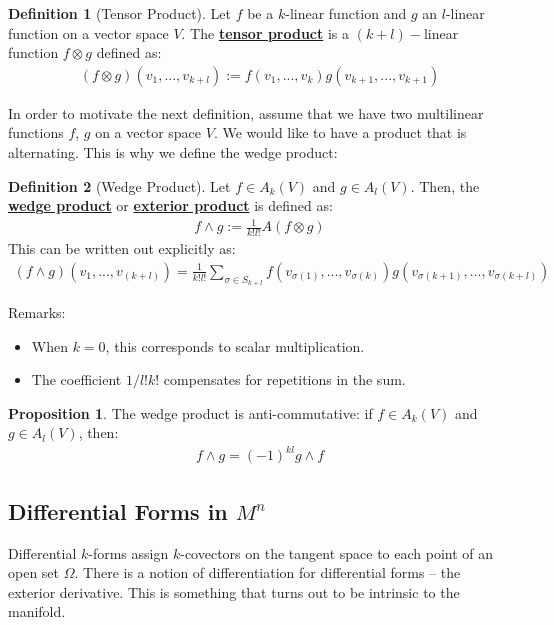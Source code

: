 \documentclass[11pt]{scrartcl}
\theoremstyle{definition}
\newtheorem{definition}{Definition}
\newtheorem{prop}{Proposition}
\theoremstyle{remark}
\newcommand{\dfn}[1]{\textbf{\underline{#1}}}
\begin{document}
{\begin{definition}[Tensor Product]
	Let $f$ be a $k$-linear function and $g$ an $l$-linear function on a vector space $V$. The \dfn{tensor product} is a $(k+l)-$linear function $f \otimes g$ defined as: 
	\begin{align}
		(f \otimes g)(v_1, ..., v_{k+l}) := f(v_1, ..., v_k) g(v_{k+1}, ..., v_{k+1}) 	
	\end{align}

\end{definition}

In order to motivate the next definition, assume that we have two multilinear functions $f$, $g$ on a vector space $V$. We would like to have a product that is alternating. This is why we define the wedge product: 

\begin{definition}[Wedge Product]
	Let $f \in A_k(V)$ and $g \in A_l(V)$. Then, the \dfn{wedge product} or \dfn{exterior product} is defined as:
	\begin{align*}
		f \wedge g := \frac{1}{k!l!} A(f \otimes g) 
	\end{align*}
	This can be written out explicitly as: 
	\begin{align*}
		(f \wedge g)(v_1, ..., v_{(k+l)}) = \frac{1}{k!l!} \sum_{ \sigma \in S_{k+l}} f(v_{\sigma(1)}, ..., v_{\sigma(k)} ) g(v_{\sigma(k+1)}, ..., v_{\sigma(k+l)}) 
	\end{align*}
\end{definition}
Remarks: 
\begin{itemize}[noitemsep]
	\item When $k=0$, this corresponds to scalar multiplication. 
	\item The coefficient $1/l!k!$ compensates for repetitions in the sum. 
\end{itemize}

\begin{prop}
	The wedge product is anti-commutative: if $f \in A_k(V)$ and $g \in A_l (V)$, then: 
	\begin{align*}
		f \wedge g = (-1)^{kl} g \wedge f
	\end{align*} 
\end{prop}


\subsection{Differential Forms in $M^n$}
Differential $k$-forms assign $k$-covectors on the tangent space to each point of an open set $\Omega$. There is a notion of differentiation for differential forms -- the exterior derivative. This is something that turns out to be intrinsic to the manifold. 

}
\end{document}
